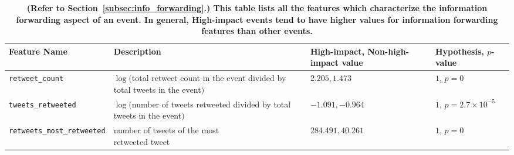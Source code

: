\begin{table}
  \centering
  {\scriptsize
    \begin{tabular}{llll}
      \toprule
      Feature Name &  \multicolumn{1}{l}{Description} & High-impact, Non-high-impact value & Hypothesis, $p$-value\\
      \midrule
      \texttt{retweet\_count} & \pbox{20cm}{$\log($total retweet count \\in the event divided by total\\ tweets in the event$)$} & $2.205, 1.473$ & $1$, $p = 0$ \\
      \midrule
      \texttt{tweets\_retweeted} & \pbox{20cm}{$\log($number of tweets \\retweeted divided by\\ total tweets in the event$)$} & $-1.091, -0.964$ & $1$, $p = 2.7\times10^{-5}$ \\
      \midrule
      \texttt{retweets\_most\_retweeted} & \pbox{20cm}{number of tweets of the most \\retweeted tweet} & $284.491, 40.261$ & $1$, $p = 0$ \\
      \bottomrule
    \end{tabular}
  }
  \caption{\textbf{(Refer to Section~\ref{subsec:info_forwarding}.) This table lists all the features which characterize the information forwarding aspect of an event.  In general, High-impact events tend to have higher values for information forwarding features than other events.}}
  \label{tab:information_forwarding}
\end{table}


